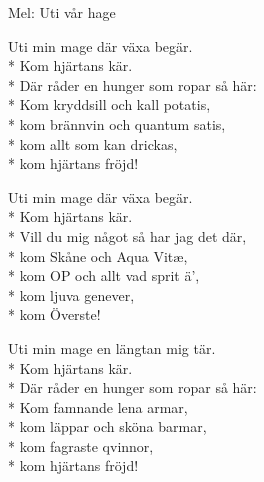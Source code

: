 \begin{SongText}
    \begin{SongInfo}
        Mel: Uti vår hage
    \end{SongInfo}
    \begin{SongVerse}
        Uti min mage där växa begär.\\*%
        Kom hjärtans kär.\\*%
        Där råder en hunger som ropar så här:\\*%
        Kom kryddsill och kall potatis,\\*%
        kom brännvin och quantum satis,\\*%
        kom allt som kan drickas,\\*%
        kom hjärtans fröjd!
    \end{SongVerse}
    \begin{SongVerse}
        Uti min mage där växa begär.\\*%
        Kom hjärtans kär.\\*%
        Vill du mig något så har jag det där,\\*%
        kom Skåne och Aqua Vitæ,\\*%
        kom OP och allt vad sprit ä’,\\*%
        kom ljuva genever,\\*%
        kom Överste!
    \end{SongVerse}
    \begin{SongVerse}
        Uti min mage en längtan mig tär.\\*%
        Kom hjärtans kär.\\*%
        Där råder en hunger som ropar så här:\\*%
        Kom famnande lena armar,\\*%
        kom läppar och sköna barmar,\\*%
        kom fagraste qvinnor,\\*%
        kom hjärtans fröjd!
    \end{SongVerse}
\end{SongText}
